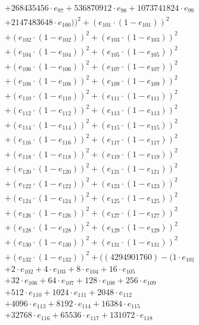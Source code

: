 \documentclass[10pt, a4paper]{article}
\begin{document}
\begin{small}
\begin{align*}
& + 268435456 \cdot e_{97} + 536870912 \cdot e_{98} + 1073741824 \cdot e_{99} \\
& + 2147483648 \cdot e_{100}))^{2} + (e_{101} \cdot (1 - e_{101}))^{2} \\
& + (e_{102} \cdot (1 - e_{102}))^{2} + (e_{103} \cdot (1 - e_{103}))^{2} \\
& + (e_{104} \cdot (1 - e_{104}))^{2} + (e_{105} \cdot (1 - e_{105}))^{2} \\
& + (e_{106} \cdot (1 - e_{106}))^{2} + (e_{107} \cdot (1 - e_{107}))^{2} \\
& + (e_{108} \cdot (1 - e_{108}))^{2} + (e_{109} \cdot (1 - e_{109}))^{2} \\
& + (e_{110} \cdot (1 - e_{110}))^{2} + (e_{111} \cdot (1 - e_{111}))^{2} \\
& + (e_{112} \cdot (1 - e_{112}))^{2} + (e_{113} \cdot (1 - e_{113}))^{2} \\
& + (e_{114} \cdot (1 - e_{114}))^{2} + (e_{115} \cdot (1 - e_{115}))^{2} \\
& + (e_{116} \cdot (1 - e_{116}))^{2} + (e_{117} \cdot (1 - e_{117}))^{2} \\
& + (e_{118} \cdot (1 - e_{118}))^{2} + (e_{119} \cdot (1 - e_{119}))^{2} \\
& + (e_{120} \cdot (1 - e_{120}))^{2} + (e_{121} \cdot (1 - e_{121}))^{2} \\
& + (e_{122} \cdot (1 - e_{122}))^{2} + (e_{123} \cdot (1 - e_{123}))^{2} \\
& + (e_{124} \cdot (1 - e_{124}))^{2} + (e_{125} \cdot (1 - e_{125}))^{2} \\
& + (e_{126} \cdot (1 - e_{126}))^{2} + (e_{127} \cdot (1 - e_{127}))^{2} \\
& + (e_{128} \cdot (1 - e_{128}))^{2} + (e_{129} \cdot (1 - e_{129}))^{2} \\
& + (e_{130} \cdot (1 - e_{130}))^{2} + (e_{131} \cdot (1 - e_{131}))^{2} \\
& + (e_{132} \cdot (1 - e_{132}))^{2} + ((4294901760) - (1 \cdot e_{101} \\
& + 2 \cdot e_{102} + 4 \cdot e_{103} + 8 \cdot e_{104} + 16 \cdot e_{105} \\
& + 32 \cdot e_{106} + 64 \cdot e_{107} + 128 \cdot e_{108} + 256 \cdot e_{109} \\
& + 512 \cdot e_{110} + 1024 \cdot e_{111} + 2048 \cdot e_{112} \\
& + 4096 \cdot e_{113} + 8192 \cdot e_{114} + 16384 \cdot e_{115} \\
& + 32768 \cdot e_{116} + 65536 \cdot e_{117} + 131072 \cdot e_{118} \\

\end{align*}
\end{small}
\end{document}
